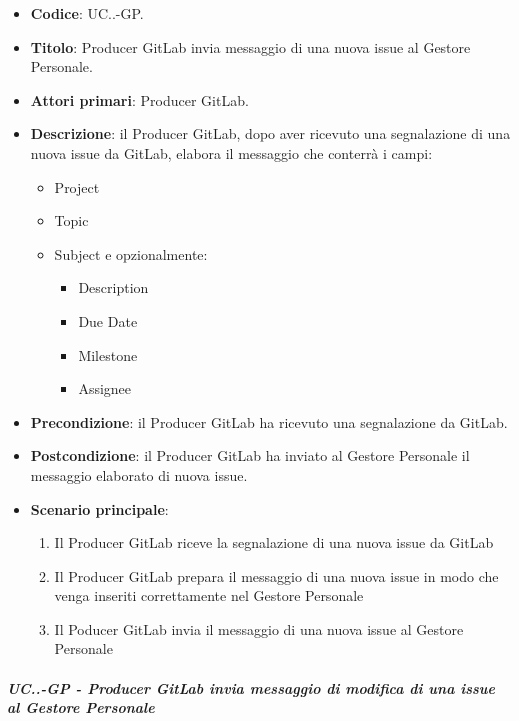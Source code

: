 			\begin{itemize}
				\item \textbf{Codice}: UC\theuccount.\thesubuccount.\thesubsubuccount-GP.
				\item \textbf{Titolo}: Producer GitLab invia messaggio di una nuova issue al Gestore Personale.
				\item \textbf{Attori primari}: Producer GitLab.
				\item \textbf{Descrizione}: il Producer GitLab, dopo aver ricevuto una segnalazione di una nuova issue da GitLab, elabora il messaggio che conterrà i campi:
				\begin{itemize}
					\item Project
					\item Topic
					\item Subject e opzionalmente:
					\begin{itemize}
						\item Description
						\item Due Date
						\item Milestone
						\item Assignee
					\end{itemize}
				\end{itemize}
				\item \textbf{Precondizione}: il Producer GitLab ha ricevuto una segnalazione da GitLab.
				\item \textbf{Postcondizione}: il Producer GitLab ha inviato al Gestore Personale il messaggio elaborato di nuova issue.
				\item \textbf{Scenario principale}: 
				\begin{enumerate}
					\item Il Producer GitLab riceve la segnalazione di una nuova issue da GitLab
					\item Il Producer GitLab prepara il messaggio di una nuova issue in modo che venga inseriti correttamente nel Gestore Personale
					\item Il Poducer GitLab invia il messaggio di una nuova issue al Gestore Personale
				\end{enumerate}
				
			\end{itemize}
		
		\subparagraph{UC\theuccount.\thesubuccount.\thesubsubuccount-GP - Producer GitLab invia messaggio di modifica di una issue al Gestore Personale}
			
